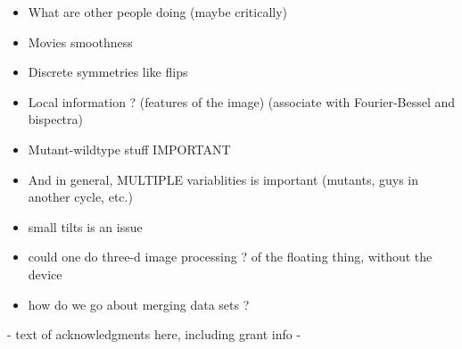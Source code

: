 \documentclass{pnastwo}
\begin{document}
\begin{article}
\begin{itemize}
\item What are other people doing  (maybe critically)
\item Movies  smoothness
\item Discrete symmetries like flips
\item Local information ? (features of the image) (associate with Fourier-Bessel and bispectra)
\item Mutant-wildtype stuff  IMPORTANT
\item And in general, MULTIPLE variablities is important (mutants, guys in another cycle, etc.)

\item  small tilts is an issue
\item   could one do three-d image processing ?  of the floating thing, without the device
\item how do we go about merging data sets ?
\end{itemize}





\begin{materials}


\end{materials}




\begin{acknowledgments}
- text of acknowledgments here, including grant info -
\end{acknowledgments}




\end{article}
\end{document}

